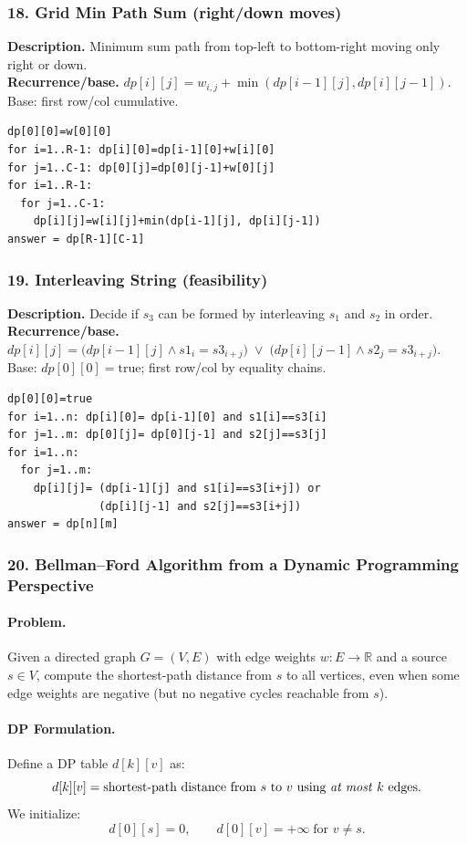 \documentclass[9pt]{extarticle}
\begin{document}
\subsubsection{18. Grid Min Path Sum (right/down moves)}
\textbf{Description.} Minimum sum path from top-left to bottom-right moving only right or down.\\
\textbf{Recurrence/base.} \(dp[i][j]=w_{i,j}+\min(dp[i-1][j],dp[i][j-1])\).  \\
Base: first row/col cumulative.
\begin{verbatim}
dp[0][0]=w[0][0]
for i=1..R-1: dp[i][0]=dp[i-1][0]+w[i][0]
for j=1..C-1: dp[0][j]=dp[0][j-1]+w[0][j]
for i=1..R-1:
  for j=1..C-1:
    dp[i][j]=w[i][j]+min(dp[i-1][j], dp[i][j-1])
answer = dp[R-1][C-1]
\end{verbatim}

\subsubsection{19. Interleaving String (feasibility)}
\textbf{Description.} Decide if \(s_3\) can be formed by interleaving \(s_1\) and \(s_2\) in order.\\
\textbf{Recurrence/base.} \(dp[i][j]=\big( dp[i-1][j]\land s1_i=s3_{i+j}\big)\;\lor\;\big( dp[i][j-1]\land s2_j=s3_{i+j}\big)\).  \\
Base: \(dp[0][0]=\text{true}\); first row/col by equality chains.
\begin{verbatim}
dp[0][0]=true
for i=1..n: dp[i][0]= dp[i-1][0] and s1[i]==s3[i]
for j=1..m: dp[0][j]= dp[0][j-1] and s2[j]==s3[j]
for i=1..n:
  for j=1..m:
    dp[i][j]= (dp[i-1][j] and s1[i]==s3[i+j]) or
              (dp[i][j-1] and s2[j]==s3[i+j])
answer = dp[n][m]
\end{verbatim}
\subsubsection{20. Bellman--Ford Algorithm from a Dynamic Programming Perspective}

\paragraph{Problem.}
Given a directed graph $G=(V,E)$ with edge weights $w:E\to\mathbb{R}$ and a source $s\in V$, compute the shortest-path distance from $s$ to all vertices, even when some edge weights are negative (but no negative cycles reachable from $s$).

\paragraph{DP Formulation.}
Define a DP table $d[k][v]$ as:
\[
  d[k][v] = \text{shortest-path distance from $s$ to $v$ using \emph{at most} $k$ edges}.
\]
We initialize:
\[
  d[0][s] = 0, \qquad d[0][v] = +\infty \;\text{for } v \neq s.
\]
\end{document}
